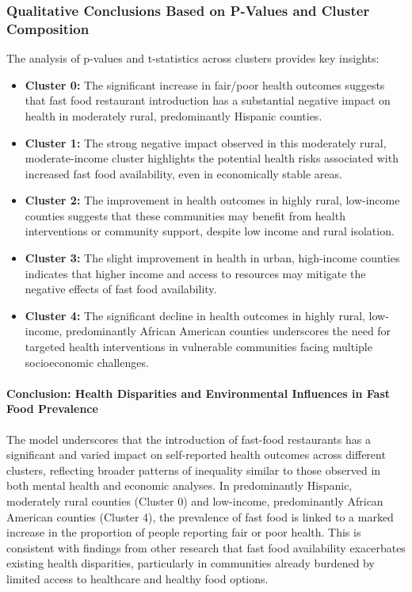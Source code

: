 \documentclass[letterpaper, 11pt]{report}
\begin{document}
\subsubsection{Qualitative Conclusions Based on P-Values and Cluster Composition}
The analysis of p-values and t-statistics across clusters provides key insights:

\begin{itemize}
    \item \textbf{Cluster 0:} The significant increase in fair/poor health outcomes suggests that fast food restaurant introduction has a substantial negative impact on health in moderately rural, predominantly Hispanic counties.
    \item \textbf{Cluster 1:} The strong negative impact observed in this moderately rural, moderate-income cluster highlights the potential health risks associated with increased fast food availability, even in economically stable areas.
    \item \textbf{Cluster 2:} The improvement in health outcomes in highly rural, low-income counties suggests that these communities may benefit from health interventions or community support, despite low income and rural isolation.
    \item \textbf{Cluster 3:} The slight improvement in health in urban, high-income counties indicates that higher income and access to resources may mitigate the negative effects of fast food availability.
    \item \textbf{Cluster 4:} The significant decline in health outcomes in highly rural, low-income, predominantly African American counties underscores the need for targeted health interventions in vulnerable communities facing multiple socioeconomic challenges.
\end{itemize}

\paragraph{Conclusion: Health Disparities and Environmental Influences in Fast Food Prevalence}

The model underscores that the introduction of fast-food restaurants has a significant and varied impact on self-reported health outcomes across different clusters, reflecting broader patterns of inequality similar to those observed in both mental health and economic analyses. In predominantly Hispanic, moderately rural counties (Cluster 0) and low-income, predominantly African American counties (Cluster 4), the prevalence of fast food is linked to a marked increase in the proportion of people reporting fair or poor health. This is consistent with findings from other research that fast food availability exacerbates existing health disparities, particularly in communities already burdened by limited access to healthcare and healthy food options.
\end{document}
